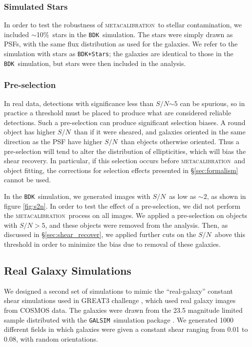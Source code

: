 \documentclass[iop]{emulateapj}
\newcommand{\snr}{$S/N$}
\newcommand{\mcal}{\textsc{metacalibration}}
\newcommand{\nsimNstarperc}{10\%}
\newcommand{\bdksim}{\texttt{BDK}}
\newcommand{\bdstar}{\texttt{BDK+Stars}}
\newcommand{\galsim}{\texttt{GALSIM}}
\begin{document}
\subsubsection{Simulated Stars}

In order to test the robustness of \mcal\ to stellar contamination, we included
$\sim$\nsimNstarperc\ stars in the \bdksim\ simulation.  The stars were simply
drawn as PSFs, with the same flux distribution as used for the galaxies.  We
refer to the simulation with stars as \bdstar; the galaxies are identical to
those in the \bdksim\ simulation, but stars were then included in the analysis.

\subsubsection{Pre-selection} \label{sec:preselect}

In real data, detections with significance less than \snr$\sim 5$ can be
spurious, so in practice a threshold must be placed to produce what are
considered reliable detections.  Such a pre-selection can produce significant
selection biases.  A round object has higher \snr\ than if it were sheared, and
galaxies oriented in the same direction as the PSF have higher \snr\ than
ebjects otherwise oriented.  Thus a pre-selection will tend to alter the
distribution of ellipticities, which will bias the shear recovery.  In
particular, if this selection occurs before \mcal\ and object fitting, the
corrections for selection effects presented in \S \ref{sec:formalism} cannot be
used.

In the \bdksim\ simulation, we generated images with \snr\ as low as $\sim 2$, as
shown in figure \ref{fig:s2n}.  In order to test the effect of a pre-selection,
we did not perform the \mcal\ process on all images.  We applied a
pre-selection on objects with \snr$ > 5$, and these objects were removed
from the analysis.  Then, as discussed in \S \ref{sec:shear_recover}, we
applied further cuts on the \snr\ above this threshold in order to minimize the
bias due to removal of these galaxies.


\subsection{Real Galaxy Simulations} \label{sec:cosmosim}

We designed a second set of simulations to mimic the ``real-galaxy'' constant
shear simulations used in GREAT3 challenge \citep{great3}, which used
real galaxy images from COSMOS data.  The galaxies were
drawn from the 23.5 magnitude limited sample distributed
with the \galsim\ simulation package \citep{GALSIM2015}.  We generated 1000
different fields in which galaxies were given a constant shear ranging from
0.01 to 0.08, with random orientations.
\end{document}
